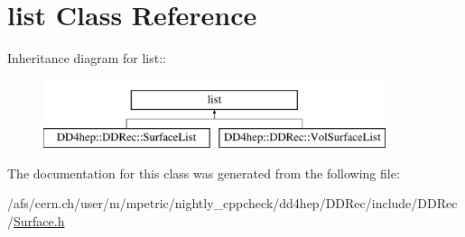 \hypertarget{classstd_1_1list}{
\section{list Class Reference}
\label{classstd_1_1list}
}
Inheritance diagram for list::\begin{figure}[H]
\begin{center}
\leavevmode
\includegraphics[height=2cm]{classstd_1_1list}
\end{center}
\end{figure}


The documentation for this class was generated from the following file:\begin{DoxyCompactItemize}
\item 
/afs/cern.ch/user/m/mpetric/nightly\_\-cppcheck/dd4hep/DDRec/include/DDRec/\hyperlink{_surface_8h}{Surface.h}\end{DoxyCompactItemize}

